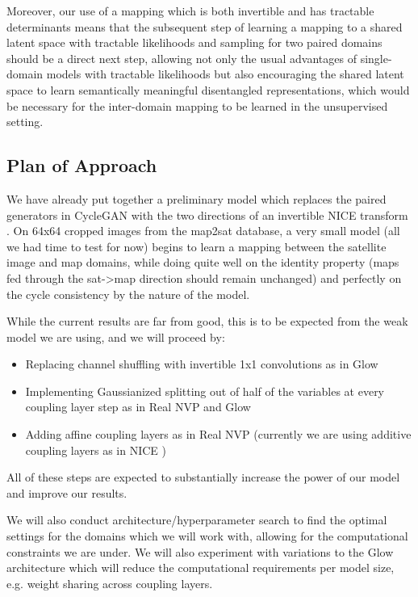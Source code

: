 \documentclass{article}
\begin{document}
Moreover, our use of a mapping which is both invertible and has tractable determinants means that the subsequent step of learning a mapping to a shared latent space with tractable likelihoods and sampling for two paired domains should be a direct next step, allowing not only the usual advantages of single-domain models with tractable likelihoods but also encouraging the shared latent space to learn semantically meaningful disentangled representations, which would be necessary for the inter-domain mapping to be learned in the unsupervised setting.

\subsection{Plan of Approach}
We have already put together a preliminary model which replaces the paired generators in CycleGAN \citep{zhu2017unpaired} with the two directions of an invertible NICE transform \citep{dinh2014nice}. On 64x64 cropped images from the map2sat database, a very small model (all we had time to test for now) begins to learn a mapping between the satellite image and map domains, while doing quite well on the identity property (maps fed through the sat->map direction should remain unchanged) and perfectly on the cycle consistency by the nature of the model.

While the current results are far from good, this is to be expected from the weak model we are using, and we will proceed by:
\begin{itemize}
    \item Replacing channel shuffling with invertible 1x1 convolutions as in Glow \citep{kingma2018glow}
    \item Implementing Gaussianized splitting out of half of the variables at every coupling layer step as in Real NVP \citep{dinh2016density} and Glow \citep{kingma2018glow}
    \item Adding affine coupling layers as in Real NVP \citep{dinh2016density} (currently we are using additive coupling layers as in NICE \citep{dinh2014nice})
\end{itemize}
All of these steps are expected to substantially increase the power of our model and improve our results.

We will also conduct architecture/hyperparameter search to find the optimal settings for the domains which we will work with, allowing for the computational constraints we are under. We will also experiment with variations to the Glow architecture which will reduce the computational requirements per model size, e.g. weight sharing across coupling layers.
\end{document}
